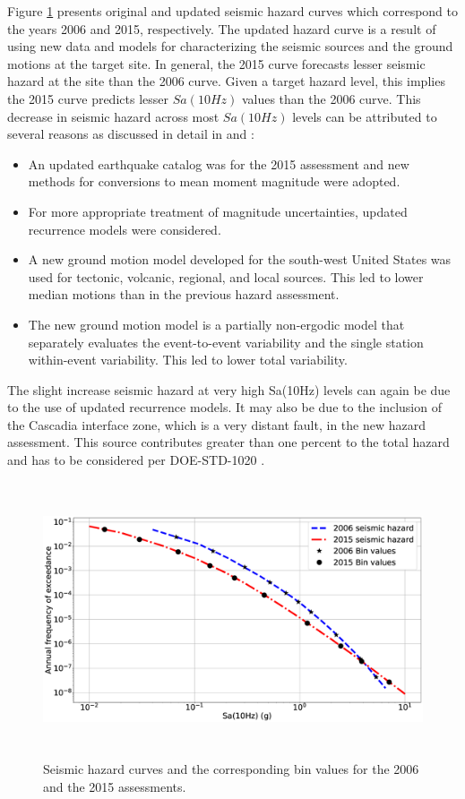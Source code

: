 \documentclass[3p]{elsarticle}
\begin{document}
Figure \ref{fig:SH} presents original and updated seismic hazard curves which correspond to the years 2006 and 2015, respectively. The updated hazard curve is a result of using new data and models for characterizing the seismic sources and the ground motions at the target site. In general, the 2015 curve forecasts lesser seismic hazard at the site than the 2006 curve. Given a target hazard level, this implies the 2015 curve predicts lesser $Sa(10Hz)$ values than the 2006 curve. This decrease in seismic hazard across most $Sa(10Hz)$ levels can be attributed to several reasons as discussed in detail in \citet{Payne2017b} and \citet{Payne2017}:

\begin{itemize}
    \item An updated earthquake catalog was for the 2015 assessment and new methods for conversions to mean moment magnitude were adopted.
    \item For more appropriate treatment of magnitude uncertainties, updated recurrence models were considered.
    \item A new ground motion model developed for the south-west United States was used for tectonic, volcanic, regional, and local sources. This led to lower median motions than in the previous hazard assessment.
    \item The new ground motion model is a partially non-ergodic model that separately evaluates the event-to-event variability and the single station within-event variability. This led to lower total variability.
\end{itemize}

\noindent The slight increase seismic hazard at very high Sa(10Hz) levels can again be due to the use of updated recurrence models. It may also be due to the inclusion of the Cascadia interface zone, which is a very distant fault, in the new hazard assessment. This source contributes greater than one percent to the total hazard and has to be considered per DOE-STD-1020 \cite{DOE2012}.  

\begin{figure}[h]
\centering
\includegraphics[width=5.5in, height = 3.2in]{Seismic_Hazard.eps}
\caption{Seismic hazard curves and the corresponding bin values for the 2006 and the 2015 assessments.}\label{fig:SH}
\end{figure}
\end{document}
